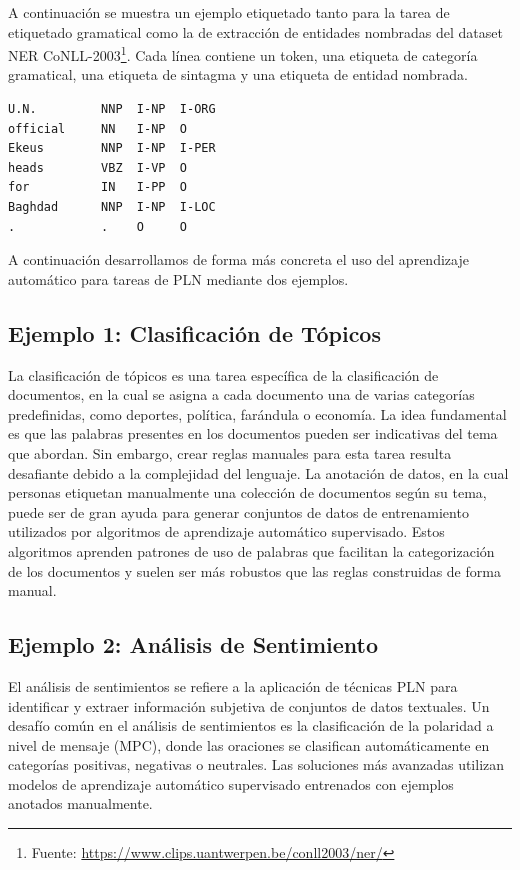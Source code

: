 \begin{example}
A continuación se muestra un ejemplo etiquetado tanto para la tarea de etiquetado gramatical como la de extracción de entidades nombradas del dataset NER CoNLL-2003\footnote{Fuente: \url{https://www.clips.uantwerpen.be/conll2003/ner/}}. Cada línea contiene un token, una etiqueta de categoría gramatical, una etiqueta de sintagma y una etiqueta de entidad nombrada.

\begin{center}
\begin{verbatim}
U.N.         NNP  I-NP  I-ORG
official     NN   I-NP  O
Ekeus        NNP  I-NP  I-PER
heads        VBZ  I-VP  O
for          IN   I-PP  O
Baghdad      NNP  I-NP  I-LOC
.            .    O     O
\end{verbatim}
\end{center}
\end{example}



A continuación desarrollamos de forma más concreta el uso del aprendizaje automático para tareas de PLN mediante dos ejemplos.

\subsection{Ejemplo 1: Clasificación de Tópicos}

La clasificación de tópicos es una tarea específica de la clasificación de documentos, en la cual se asigna a cada documento una de varias categorías predefinidas, como deportes, política, farándula o economía. La idea fundamental es que las palabras presentes en los documentos pueden ser indicativas del tema que abordan. Sin embargo, crear reglas manuales para esta tarea resulta desafiante debido a la complejidad del lenguaje. La anotación de datos, en la cual personas etiquetan manualmente una colección de documentos según su tema, puede ser de gran ayuda para generar conjuntos de datos de entrenamiento utilizados por algoritmos de aprendizaje automático supervisado. Estos algoritmos aprenden patrones de uso de palabras que facilitan la categorización de los documentos y suelen ser más robustos que las reglas construidas de forma manual.


\subsection{Ejemplo 2: Análisis de Sentimiento}

El análisis de sentimientos se refiere a la aplicación de técnicas PLN para identificar y extraer información subjetiva de conjuntos de datos textuales. Un desafío común en el análisis de sentimientos es la clasificación de la polaridad a nivel de mensaje (MPC), donde las oraciones se clasifican automáticamente en categorías positivas, negativas o neutrales. Las soluciones más avanzadas utilizan modelos de aprendizaje automático supervisado entrenados con ejemplos anotados manualmente.


